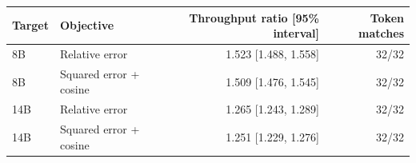 \begin{tabular}{llrr}
\toprule
Target & Objective & Throughput ratio [95\% interval] & Token matches \\
\midrule
8B & Relative error & 1.523 [1.488, 1.558] & 32/32 \\
8B & Squared error + cosine & 1.509 [1.476, 1.545] & 32/32 \\
14B & Relative error & 1.265 [1.243, 1.289] & 32/32 \\
14B & Squared error + cosine & 1.251 [1.229, 1.276] & 32/32 \\
\bottomrule
\end{tabular}
